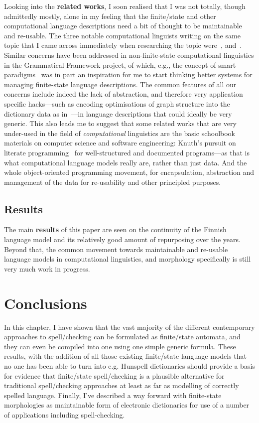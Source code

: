 \documentclass[officiallayout,final]{unihelcompling}
\begin{document}
Looking into the \textbf{related works}, I soon realised that I was not
totally, though admittedly mostly, alone in my feeling that the finite\-/state
and other computational language descriptions need a bit of thought to be
maintainable and re-usable. The three notable computational linguists writing
on the same topic that I came across immediately when researching the topic
were~\citet{maxwell2008joint}, and~\citet{wintner2008strengths}. Similar
concerns have been addressed in non-finite-state computational linguistics in
the Grammatical Framework project, of which, e.g., the concept of smart
paradigms~\citep{ranta2008predictable} was in part an inspiration for me to
start thinking better systems for managing finite-state language descriptions.
The common features of all our concerns include indeed the lack of abstraction,
and therefore very application specific hacks---such as encoding optimisations
of graph structure into the dictionary data as
in~\citep{karttunen2006numbers}---in language descriptions that could ideally
be very generic. This also leads me to suggest that some related works that are
very under-used in the field of \emph{computational} linguistics are the basic
schoolbook materials on computer science and software engineering: Knuth's
pursuit on literate programming~\citep{knuth1984literate} for well-structured
and documented programs---as that is what computational language models really
are, rather than just data. And the whole object-oriented programming movement,
for encapsulation, abstraction and management of the data for re-usability and
other principled purposes.

\subsection{Results}

The main \textbf{results} of this paper are seen on the continuity of the
Finnish language model and its relatively good amount of repurposing over the
years.  Beyond that, the common movement towards maintainable and re-usable
language models in computational linguistics, and morphology specifically is
still very much work in progress.

\section{Conclusions}

In this chapter, I have shown that the vast majority of the different
contemporary approaches to spell\-/checking can be formulated as finite\-/state
automata, and they can even be compiled into one using one simple generic
formula. These results, with the addition of all those existing finite\-/state
language models that no one has been able to turn into e.g. Hunspell
dictionaries should provide a basis for evidence that finite\-/state
spell\-/checking is a plausible alternative for traditional spell\-/checking
approaches at least as far as modelling of correctly spelled language. Finally,
I've described a way forward with finite-state morphologies as maintainable
form of electronic dictionaries for use of a number of applications including
spell-checking.
\end{document}
